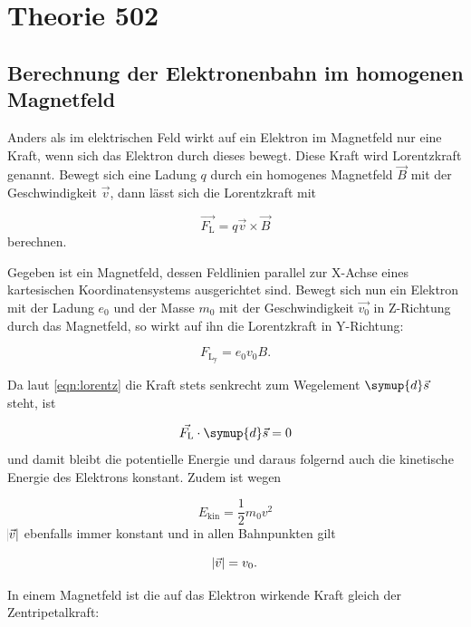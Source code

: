 \section{Theorie 502}

\subsection{Berechnung der Elektronenbahn im homogenen Magnetfeld}
Anders als im elektrischen Feld wirkt auf ein Elektron im Magnetfeld nur eine Kraft, wenn sich das Elektron durch dieses bewegt. Diese Kraft wird Lorentzkraft genannt. Bewegt sich eine Ladung $q$ durch ein homogenes Magnetfeld 
$\vec{B}$ mit der Geschwindigkeit $\vec{v}$, dann lässt sich die Lorentzkraft mit

\begin{equation}
\vec{F_{\text{L}}} = q \vec{v} \times \vec{B}
\label{eqn:lorentz}
\end{equation}
berechnen. 

Gegeben ist ein Magnetfeld, dessen Feldlinien parallel zur X-Achse eines kartesischen Koordinatensystems ausgerichtet sind. Bewegt sich nun ein Elektron mit der Ladung $e_0$ und der Masse $m_0$ mit der Geschwindigkeit $\vec{v_0}$ 
in Z-Richtung durch das Magnetfeld, so wirkt auf ihn die Lorentzkraft in Y-Richtung:

\begin{equation} 
F_{\text{L}_{\text{y}}} = e_0 v_0 B.
\end{equation}

Da laut \ref{eqn:lorentz} die Kraft stets senkrecht zum Wegelement $\symup{d}\vec{s}$ steht, ist

\begin{equation}
\vec{F_{\text{L}}} \cdot \symup{d}\vec{s} = 0
\end{equation}
und damit bleibt die potentielle Energie und daraus folgernd auch die kinetische Energie des Elektrons konstant. Zudem ist wegen

\begin{equation}
E_{\text{kin}} = \frac{1}{2} m_0 v^2
\end{equation}
$\abs{\vec{v}}$ ebenfalls immer konstant und in allen Bahnpunkten gilt

\begin{equation}
\abs{\vec{v}} = v_0.
\end{equation}

In einem Magnetfeld ist die auf das Elektron wirkende Kraft gleich der Zentripetalkraft:

